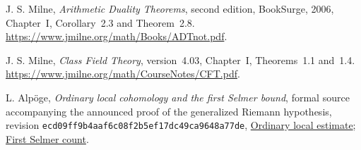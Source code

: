 J. S. Milne, \emph{Arithmetic Duality Theorems}, second edition,
BookSurge, 2006, Chapter~I, Corollary~2.3 and Theorem~2.8.
\url{https://www.jmilne.org/math/Books/ADTnot.pdf}.

J. S. Milne, \emph{Class Field Theory}, version~4.03,
Chapter~I, Theorems~1.1 and~1.4.
\url{https://www.jmilne.org/math/CourseNotes/CFT.pdf}.

L. Alp\"oge, \emph{Ordinary local cohomology and the first Selmer bound},
formal source accompanying the announced proof of the generalized
Riemann hypothesis, revision
\texttt{ecd09ff9b4aaf6c08f2b5ef17dc49ca9648a77de},
\href{https://github.com/jsmorph/rh/blob/ecd09ff9b4aaf6c08f2b5ef17dc49ca9648a77de/lean/src/Development/AutomorphicArithmetic/AutomorphicVarieties/PatchingModules/EpsilonEtaMatrices/EntryZero.lean}{Ordinary local estimate};
\href{https://github.com/jsmorph/rh/blob/ecd09ff9b4aaf6c08f2b5ef17dc49ca9648a77de/lean/src/Development/AutomorphicArithmetic/AutomorphicVarieties/PatchingModules/EpsilonEtaMatrices/W1BoundArithmeticRankTwo.lean}{First Selmer count}.
